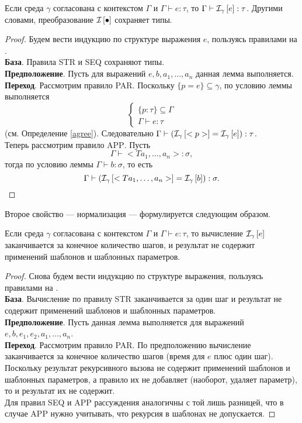 \begin{Th}
Если среда $\gamma$ согласована с контекстом $\Gamma$ и $\Gamma \vdash e : \tau$, то $\Gamma \vdash \mathcal{I}_{\gamma} \left[ e \right] : \tau$. Другими словами, преобразование $\mathcal{I}_{} \left[ \bullet \right]$ сохраняет типы.
\end{Th}
\begin{proof}
Будем вести индукцию по структуре выражения $e$, пользуясь правилами на .\\
\textbf{База}. Правила \textsc{STR} и \textsc{SEQ} сохраняют типы.\\
\textbf{Предположение}. Пусть для выражений $e, b, a_1, \ldots, a_n$ данная лемма выполняется.\\
\textbf{Переход}. Рассмотрим правило \textsc{PAR}. Поскольку $\{p = e\} \subseteq \gamma$, по условию леммы выполняется
$$
\left\{\begin{array}{l}		
		\{p : \tau\} \subseteq \Gamma \\
		\Gamma \vdash e : \tau
		\end{array}\right.
$$
(см. Определение \ref{agree}). Следовательно $\Gamma \vdash (\mathcal{I}_{\gamma} \left[ <p> \right] = \mathcal{I}_{\gamma} \left[ e \right]) : \tau$.\\
Теперь рассмотрим правило \textsc{APP}. Пусть $$\Gamma \vdash <T a_1, \ldots, a_n> : \sigma,$$ тогда по условию леммы $\Gamma \vdash b : \sigma$, то есть $$\Gamma \vdash (\mathcal{I}_{\gamma} \left[ <T a_1, \ldots, a_n> \right] = \mathcal{I}_{\gamma} \left[ b \right]) : \sigma.$$
\end{proof}

Второе свойство --- нормализация --- формулируется следующим образом.

\begin{Th}
Если среда $\gamma$ согласована с контекстом $\Gamma$ и $\Gamma \vdash e : \tau$, то вычисление $\mathcal{I}_{\gamma} \left[ e \right]$ заканчивается за конечное количество шагов, и результат не содержит применений шаблонов и шаблонных параметров.
\end{Th}
\begin{proof}
Снова будем вести индукцию по структуре выражения, пользуясь правилами на .\\
\textbf{База}. Вычисление по правилу \textsc{STR} заканчивается за один шаг и результат не содержит применений шаблонов и шаблонных параметров.\\
\textbf{Предположение}. Пусть данная лемма выполняется для выражений $e, b, e_1, e_2, a_1, \ldots, a_n$.\\
\textbf{Переход}. Рассмотрим правило \textsc{PAR}. По предположению вычисление заканчивается за конечное количество шагов (время для $e$ плюс один шаг). Поскольку результат рекурсивного вызова не содержит применений шаблонов и шаблонных параметров, а правило их не добавляет (наоборот, удаляет параметр), то и результат их не содержит.\\
Для правил \textsc{SEQ} и \textsc{APP} рассуждения аналогичны с той лишь разницей, что в случае \textsc{APP} нужно учитывать, что рекурсия в шаблонах не допускается.
\end{proof}

